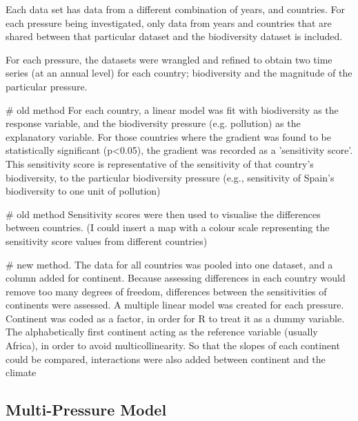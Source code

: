 \documentclass[11pt, a4paper, titlepage]{article}
\begin{document}
	Each data set has data from a different combination of years, and countries. For each pressure being investigated, only data from years and countries that are shared between that particular dataset and the biodiversity dataset is included. \newline
	
	For each pressure, the datasets were wrangled and refined to obtain two time series (at an annual level) for each country; biodiversity and the magnitude of the particular pressure. 
	
	# old method For each country, a linear model was fit with biodiversity as the response variable, and the biodiversity pressure (e.g. pollution) as the explanatory variable. For those countries where the gradient was found to be statistically significant (p<0.05), the gradient was recorded as a 'sensitivity score'. This sensitivity score is representative of the sensitivity of that country's biodiversity, to the particular biodiversity pressure (e.g., sensitivity of Spain's biodiversity to one unit of pollution) \newline
	
	# old method Sensitivity scores were then used to visualise the differences between countries. (I could insert a map with a colour scale representing the sensitivity score values from different countries) \newline
	
	# new method. The data for all countries was pooled into one dataset, and a column added for continent. Because assessing differences in each country would remove too many degrees of freedom, differences between the sensitivities of continents were assessed. A multiple linear model was created for each pressure. Continent was coded as a factor, in order for R to treat it as a dummy variable. The alphabetically first continent acting as the reference variable (usually Africa), in order to avoid multicollinearity. So that the slopes of each continent could be compared, interactions were also added between continent and the climate
	
	
	
	\subsection*{Multi-Pressure Model}
	
	
	
		
	 
	
	
	
\end{document}
